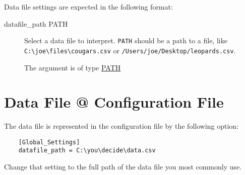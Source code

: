 Data file settings are expected in the following format:

\begin{description}

\item[datafile\_path PATH]
\hypertarget{global-datafile-path}{}

Select a data file to interpret. \texttt{PATH} should be a path to a file,
like \texttt{C:\textbackslash{}joe\textbackslash{}files\textbackslash{}cougars.csv}
or \texttt{/Users/joe/Desktop/leopards.csv}.

The argument is of type \hyperlink{argument-type-path}{PATH}

\end{description}


\section{Data File @ Configuration File}

The data file is represented in the configuration file by the
following option:

\begin{verbatim}
    [Global_Settings]
    datafile_path = C:\you\decide\data.csv
\end{verbatim}

Change that setting to the full path of the data file you most commonly use.

